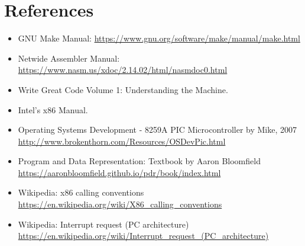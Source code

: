 \chapter*{References}\label{references}

\begin{itemize}
\tightlist
\item
  GNU Make Manual:
  \url{https://www.gnu.org/software/make/manual/make.html}
\item
  Netwide Assembler Manual:
  \url{https://www.nasm.us/xdoc/2.14.02/html/nasmdoc0.html}
\item
  Write Great Code Volume 1: Understanding the Machine.
\item
  Intel's x86 Manual.
\item
  Operating Systems Development - 8259A PIC Microcontroller by Mike,
  2007 \url{http://www.brokenthorn.com/Resources/OSDevPic.html}
\item
  Program and Data Representation: Textbook by Aaron Bloomfield
  \url{https://aaronbloomfield.github.io/pdr/book/index.html}
\item
  Wikipedia: x86 calling conventions
  \url{https://en.wikipedia.org/wiki/X86_calling_conventions}
\item
  Wikipedia: Interrupt request (PC architecture)
  \url{https://en.wikipedia.org/wiki/Interrupt_request_(PC_architecture)}
\end{itemize}
